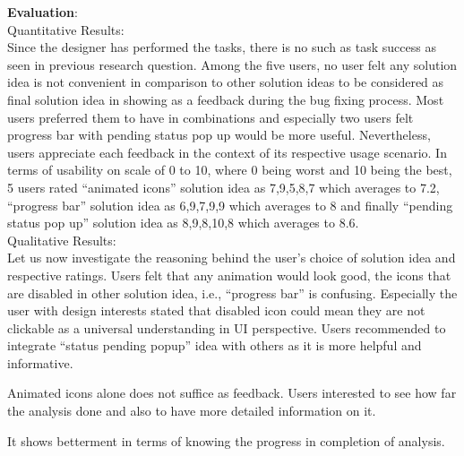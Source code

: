\textbf{Evaluation}: \\ 

Quantitative Results: \\

Since the designer has performed the tasks, there is no such as task success as seen in previous research question. Among the five users, no user felt any solution idea is not convenient in comparison to other solution ideas to be considered as final solution idea in showing as a feedback during the bug fixing process.  Most users preferred them to have in combinations and especially two users felt progress bar with pending status pop up would be more useful. Nevertheless, users appreciate each feedback in the context of its respective usage scenario. In terms of usability on scale of 0 to 10, where 0 being worst and 10 being the best, 5 users rated “animated icons” solution idea as 7,9,5,8,7 which averages to 7.2, “progress bar” solution idea as 6,9,7,9,9 which averages to 8 and finally “pending status pop up” solution idea as 8,9,8,10,8 which averages to 8.6. \\

Qualitative Results: \\

Let us now investigate the reasoning behind the user’s choice of solution idea and respective ratings. Users felt that any animation would look good, the icons that are disabled in other solution idea, i.e., “progress bar” is confusing. Especially the user with design interests stated that disabled icon could mean they are not clickable as a universal understanding in UI perspective. Users recommended to integrate “status pending popup” idea with others as it is more helpful and informative. \\



\begin{myboxi}
	Animated icons alone does not suffice as feedback. Users interested to see how far the analysis done and also to have more detailed information on it.
\end{myboxi}

\begin{myboxi}
	It shows betterment in terms of knowing the progress in completion of analysis.
\end{myboxi}

